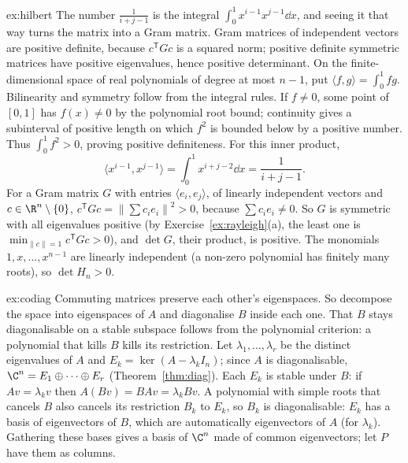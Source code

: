 \begin{solution}{ex:hilbert}
\idea The number $\frac1{i+j-1}$ is the integral $\int_0^1x^{i-1}x^{j-1}\dd x$, and seeing it that way turns the matrix into a Gram matrix. Gram matrices of independent vectors are positive definite, because $c^{\mathsf T}Gc$ is a squared norm; positive definite symmetric matrices have positive eigenvalues, hence positive determinant.
\writeup On the finite-dimensional space of real polynomials of degree at most $n-1$, put $\langle f,g\rangle=\int_0^1fg$. Bilinearity and symmetry follow from the integral rules. If $f\ne0$, some point of $[0,1]$ has $f(x)\ne0$ by the polynomial root bound; continuity gives a subinterval of positive length on which $f^2$ is bounded below by a positive number. Thus $\int_0^1f^2>0$, proving positive definiteness. For this inner product,
\[
\langle x^{i-1},x^{j-1}\rangle=\int_0^1x^{i+j-2}\dd x=\frac1{i+j-1}.
\]
For a Gram matrix $G$ with entries $\langle e_i,e_j\rangle$, of linearly independent vectors and $c\in\R^n\setminus\{0\}$,
$c^{\mathsf T}Gc=\left\|\sum c_ie_i\right\|^2>0$, because $\sum c_ie_i\ne0$. So $G$ is symmetric with all eigenvalues positive (by Exercise~\ref{ex:rayleigh}(a), the least one is $\min_{\|c\|=1}c^{\mathsf T}Gc>0$), and $\det G$, their product, is positive.
The monomials $1,x,\dots,x^{n-1}$ are linearly independent (a non-zero polynomial has finitely many roots), so $\det H_n>0$.
\end{solution}

\begin{solution}{ex:codiag}
\idea Commuting matrices preserve each other's eigenspaces. So decompose the space into eigenspaces of $A$ and diagonalise $B$ inside each one. That $B$ stays diagonalisable on a stable subspace follows from the polynomial criterion: a polynomial that kills $B$ kills its restriction.
\writeup Let $\lambda_1,\dots,\lambda_r$ be the distinct eigenvalues of $A$ and $E_k=\ker(A-\lambda_kI_n)$; since $A$ is diagonalisable, $\C^n=E_1\oplus\dots\oplus E_r$ (Theorem~\ref{thm:diag}).
Each $E_k$ is stable under $B$: if $Av=\lambda_kv$ then $A(Bv)=BAv=\lambda_kBv$. A polynomial with simple roots that cancels $B$ also cancels its restriction $B_k$ to $E_k$,
so $B_k$ is diagonalisable: $E_k$ has a basis of eigenvectors of $B$, which are automatically eigenvectors of $A$ (for $\lambda_k$). Gathering these bases gives a basis of $\C^n$ made of common eigenvectors; let $P$ have them as columns.
\end{solution}


